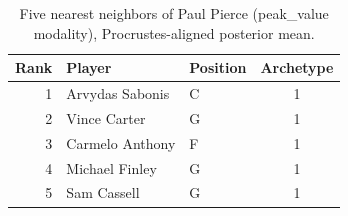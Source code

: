 \begin{table}[htbp]
  \centering\small
  \begin{tabular}{rllc}
    \toprule
    Rank & Player & Position & Archetype \\
    \midrule
    1 & Arvydas Sabonis & C & 1 \\
    2 & Vince Carter & G & 1 \\
    3 & Carmelo Anthony & F & 1 \\
    4 & Michael Finley & G & 1 \\
    5 & Sam Cassell & G & 1 \\
    \bottomrule
  \end{tabular}
  \caption{Five nearest neighbors of Paul Pierce (peak_value modality), Procrustes-aligned posterior mean.}
  \label{tab:Paul_Pierce_neighbors_peak_value}
\end{table}

